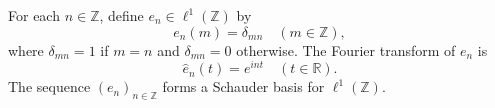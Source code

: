 For each $n \in \mathbb{Z}$, define $e_n \in \ell^1(\mathbb{Z})$ by
$$e_n(m) = \delta_{mn} \quad (m \in \mathbb{Z}),$$
where $\delta_{mn} = 1$ if $m = n$ and $\delta_{mn} = 0$ otherwise. The Fourier transform of $e_n$ is
$$\hat{e}_n(t) = e^{int} \quad (t \in \mathbb{R}).$$
The sequence $(e_n)_{n \in \mathbb{Z}}$ forms a Schauder basis for $\ell^1(\mathbb{Z})$.
